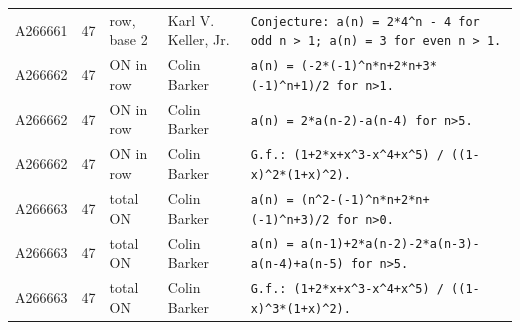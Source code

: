 \documentclass[11pt]{article}
\theoremstyle{definition}
\theoremstyle{remark}
\begin{document}
{\begin{longtable}{p{1.3cm}p{0.7cm}p{2.4cm}p{2.3cm}p{7.3cm}}
A266661 & 47 & row, base 2 & Karl V. Keller, Jr. & \texttt{Conjecture: \allowbreak{}a(n)\allowbreak{} \allowbreak{}=\allowbreak{} \allowbreak{}2*\allowbreak{}4\^{}n \allowbreak{}-\allowbreak{} \allowbreak{}4 \allowbreak{}for \allowbreak{}odd \allowbreak{}n \allowbreak{}> \allowbreak{}1; \allowbreak{}a(n)\allowbreak{} \allowbreak{}=\allowbreak{} \allowbreak{}3 \allowbreak{}for \allowbreak{}even \allowbreak{}n \allowbreak{}> \allowbreak{}1.} \\
A266662 & 47 & ON in row & Colin Barker & \texttt{a(n)\allowbreak{} \allowbreak{}=\allowbreak{} \allowbreak{}(-\allowbreak{}2*\allowbreak{}(-\allowbreak{}1)\allowbreak{}\^{}n*\allowbreak{}n+\allowbreak{}2*\allowbreak{}n+\allowbreak{}3*\allowbreak{}(-\allowbreak{}1)\allowbreak{}\^{}n+\allowbreak{}1)\allowbreak{}/\allowbreak{}2 \allowbreak{}for \allowbreak{}n>1.} \\
A266662 & 47 & ON in row & Colin Barker & \texttt{a(n)\allowbreak{} \allowbreak{}=\allowbreak{} \allowbreak{}2*\allowbreak{}a(n-\allowbreak{}2)\allowbreak{}-\allowbreak{}a(n-\allowbreak{}4)\allowbreak{} \allowbreak{}for \allowbreak{}n>5.} \\
A266662 & 47 & ON in row & Colin Barker & \texttt{G.f.: \allowbreak{}(1+\allowbreak{}2*\allowbreak{}x+\allowbreak{}x\^{}3-\allowbreak{}x\^{}4+\allowbreak{}x\^{}5)\allowbreak{} \allowbreak{}/\allowbreak{} \allowbreak{}((1-\allowbreak{}x)\allowbreak{}\^{}2*\allowbreak{}(1+\allowbreak{}x)\allowbreak{}\^{}2)\allowbreak{}.} \\
A266663 & 47 & total ON & Colin Barker & \texttt{a(n)\allowbreak{} \allowbreak{}=\allowbreak{} \allowbreak{}(n\^{}2-\allowbreak{}(-\allowbreak{}1)\allowbreak{}\^{}n*\allowbreak{}n+\allowbreak{}2*\allowbreak{}n+\allowbreak{}(-\allowbreak{}1)\allowbreak{}\^{}n+\allowbreak{}3)\allowbreak{}/\allowbreak{}2 \allowbreak{}for \allowbreak{}n>0.} \\
A266663 & 47 & total ON & Colin Barker & \texttt{a(n)\allowbreak{} \allowbreak{}=\allowbreak{} \allowbreak{}a(n-\allowbreak{}1)\allowbreak{}+\allowbreak{}2*\allowbreak{}a(n-\allowbreak{}2)\allowbreak{}-\allowbreak{}2*\allowbreak{}a(n-\allowbreak{}3)\allowbreak{}-\allowbreak{}a(n-\allowbreak{}4)\allowbreak{}+\allowbreak{}a(n-\allowbreak{}5)\allowbreak{} \allowbreak{}for \allowbreak{}n>5.} \\
A266663 & 47 & total ON & Colin Barker & \texttt{G.f.: \allowbreak{}(1+\allowbreak{}2*\allowbreak{}x+\allowbreak{}x\^{}3-\allowbreak{}x\^{}4+\allowbreak{}x\^{}5)\allowbreak{} \allowbreak{}/\allowbreak{} \allowbreak{}((1-\allowbreak{}x)\allowbreak{}\^{}3*\allowbreak{}(1+\allowbreak{}x)\allowbreak{}\^{}2)\allowbreak{}.} \\

\end{longtable}}
\end{document}
